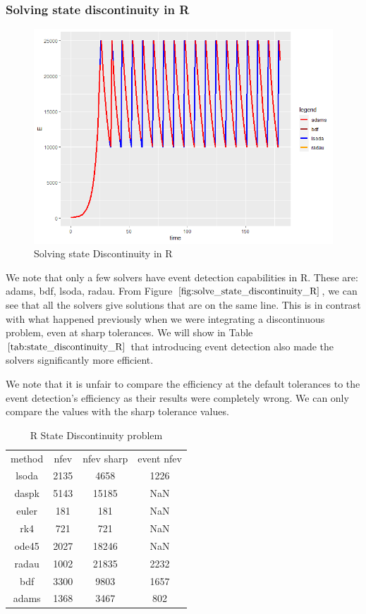 \subsubsection{Solving state discontinuity in R}
\begin{figure}[h]
	\centering
	\includegraphics[width=0.7\linewidth]{./figures/solve_state_discontinuity_R}
	\caption{Solving state Discontinuity in R}
	\label{fig:solve_state_discontinuity_R}
\end{figure}
We note that only a few solvers have event detection capabilities in R. These are: adams, bdf, lsoda, radau. From Figure $\ref{fig:solve_state_discontinuity_R}$, we can see that all the solvers give solutions that are on the same line. This is in contrast with what happened previously when we were integrating a discontinuous problem, even at sharp tolerances. We will show in Table $\ref{tab:state_discontinuity_R}$ that introducing event detection also made the solvers significantly more efficient. 

We note that it is unfair to compare the efficiency at the default tolerances to the event detection's efficiency as their results were completely wrong. We can only compare the values with the sharp tolerance values.

\begin{table}[h]
\caption {R State Discontinuity problem} 
\label{tab:state_discontinuity_R}
\begin{center}
\begin{tabular}{ c c c c } 
    method & nfev & nfev sharp & event nfev \\ 
    lsoda &   2135    & 4658  & 1226  \\
    daspk &    5143   & 15185 & NaN   \\
    euler &    181   & 181   & NaN   \\
    rk4  &     721   & 721   & NaN   \\
    ode45 &    2027   & 18246 & NaN   \\
    radau &   1002    & 21835 & 2232  \\
    bdf   &   3300    & 9803  & 1657  \\
    adams &   1368    & 3467  & 802   \\
\end{tabular}
\end{center}
\end{table}

